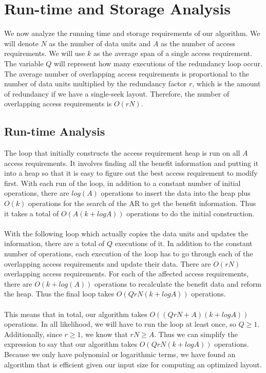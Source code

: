 \section{Run-time and Storage Analysis}

We now analyze the running time and storage requirements of our algorithm. We will denote $N$ as the number of data units and $A$ as the number of access requirements. We will use $k$ as the average span of a single access requirement. The variable $Q$ will represent how many executions of the redundancy loop occur. The average number of overlapping access requirements is proportional  to the number of data units multiplied by the redundancy factor $r$, which is the amount of redundancy if we have a single-seek layout. Therefore, the number of overlapping access requirements is $O(rN)$. 

\subsection{Run-time Analysis}

The loop that initially constructs the access requirement heap is run on all $A$ access requirements. It involves finding all the benefit information and putting it into a heap so that it is easy to figure out the best access requirement to modify first. With each run of the loop, in addition to a constant number of initial operations, there are $log(A)$ operations to insert the data into the heap plus $O(k)$ operations for the search of the AR to get the benefit information. Thus it takes a total of $O(A (k + logA))$ operations to do the initial construction. \\
\\
With the following loop which actually copies the data units and updates the information, there are a total of $Q$ executions of it. In addition to the constant number of operations, each execution of the loop has to go through each of the overlapping access requirements and update their data. There are $O(rN)$ overlapping access requirements. For each of the affected access requirements, there are $O(k + log(A))$ operations to recalculate the benefit data and reform the heap. Thus the final loop takes $O(QrN(k + logA))$ operations. \\
\\
This means that in total, our algorithm takes $O((QrN + A)(k + logA))$ operations. In all likelihood, we will have to run the loop at least once, so $Q \geq 1$. Additionally, since $r \geq 1$, we know that $rN \geq A$. Thus we can simplify the expression to say that our algorithm takes $O(QrN(k + logA))$ operations. Because we only have polynomial or logarithmic terms, we have found an algorithm that is efficient given our input size for computing an optimized layout.

